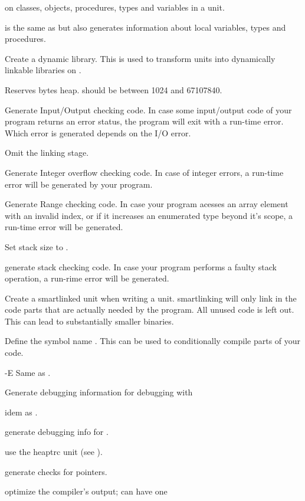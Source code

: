 \documentclass{report}
\begin{document}
\begin{description}
on classes, objects, procedures, types  and variables in a unit.
\item[-bl]  is the same as  but also generates
information about local variables, types and procedures.
\item [-CD] Create a dynamic library. This is used to transform units into
dynamically linkable libraries on \linux.
\item [-Chxxx]  Reserves  bytes heap.  should
be between 1024 and 67107840.
\item [-Ci]  Generate Input/Output checking code. In case some
input/output code of your program returns an error status, the program will
exit with a run-time error. Which error is generated depends on the I/O error.
\item [-Cn]  Omit the linking stage.
\item [-Co]  Generate Integer overflow checking code. In case of
integer errors, a run-time error will be generated by your program.
\item [-Cr]  Generate Range checking code. In case your program
acesses an array element with an invalid index, or if it increases an
enumerated type beyond it's scope, a run-time error will be generated.
\item [-Csxxx]  Set stack size to .
\item [-Ct]  generate stack checking code. In case your program
performs a faulty stack operation, a run-rime error will be generated.
\item [-CX]  Create a smartlinked unit when writing a unit.
smartlinking will only link in the code parts that are actually needed by
the program. All unused code is left out. This can lead to substantially
smaller binaries.
\item [-dxxx]  Define the symbol name . This can be used
to conditionally compile parts of your code.
\item {-E}  Same as .
\item [-g]  Generate debugging information for debugging with
\item [-gg] idem as .
\item [-gd]  generate debugging info for .
\item [-gh] use the heaptrc unit (see \unitsref).
\item [-gc] generate checks for pointers.
\item[-Oxxx]  optimize the compiler's output;  can have one

\end{description}
\end{document}
